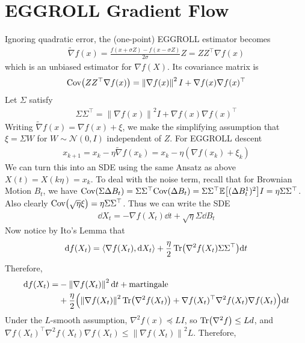 \documentclass[twoside,11pt]{article}
\newcommand{\mg}[1]{\left \| #1 \right\|}
\newcommand{\E}{\mathbb{E}\qty}
\newcommand{\Cov}{\mathrm{Cov}\qty}
\renewcommand{\grad}{\nabla}
\newcommand{\1}{\mathbbm{1}}
\begin{document}
\section{EGGROLL Gradient Flow}
Ignoring quadratic error, the (one-point) EGGROLL estimator becomes
\begin{align*}
    \tilde \grad f(x) = \frac{f(x + \sigma Z) - f(x - \sigma Z)}{2\sigma} Z = ZZ^\top \grad f(x)
\end{align*}
which is an unbiased estimator for $\grad f(X)$. Its covariance matrix is 
\begin{align*}
    \Cov(ZZ^\top \grad f(x)) = \mg{\grad f(x)}^2 I + \grad f(x) \grad f(x)^\top
\end{align*}
Let $\Sigma$ satisfy
\begin{align*}
    \Sigma \Sigma^\top = \mg{\grad f(x)}^2 I + \grad f(x) \grad f(x)^\top
\end{align*}
Writing $\tilde \grad f(x) = \grad f(x) + \xi$, we make the simplifying assumption that $\xi = \Sigma W$ for $W \sim \mathcal N(0,I)$ independent of $Z$. For EGGROLL descent
\begin{align*}
    x_{k+1} = x_k - \eta \tilde \grad f(x_k) = x_k - \eta (\grad f(x_k) + \xi_k)
\end{align*}
We can turn this into an SDE using the same Ansatz as above $X(t) = X(k \eta) = x_k$. To deal with the noise term, recall that for Brownian Motion $B_t$, we have $\Cov(\Sigma \Delta B_t) = \Sigma \Sigma^\top \Cov(\Delta B_t) = \Sigma \Sigma^\top \E[(\Delta B_t^1)^2]I = \eta \Sigma \Sigma^\top$. Also clearly $\Cov(\sqrt{\eta} \xi) = \eta \Sigma \Sigma^\top$. Thus we can write the SDE
\begin{align*}
    \dd X_t = -\grad f(X_t)\dd t + \sqrt{\eta} \Sigma \dd B_t
\end{align*}
Now notice by Ito's Lemma that
\begin{align*}
    \dd f(X_t) = \langle \grad f(X_t), \dd X_t \rangle + \frac \eta 2 \Tr(\grad^2 f(X_t) \Sigma \Sigma^\top) \dd t
\end{align*}
Therefore,
\begin{align*}
    \dd f(X_t) =& - \mg{\grad f(X_t)}^2 \dd t + \mathrm{martingale} 
    \\&+ \frac \eta 2 \qty( \mg{\grad f(X_t)}^2 \Tr(\grad^2 f(X_t)) + \grad f(X_t)^\top \grad^2 f(X_t) \grad f(X_t) )\dd t
\end{align*}
Under the $L$-smooth assumption, $\grad^2 f(x) \preceq LI$, so $\Tr(\grad^2 f) \leq Ld$, and $\grad f(X_t)^\top \grad^2 f(X_t) \grad f(X_t) \leq \mg{\grad f(X_t)}^2 L$. Therefore,
\end{document}
